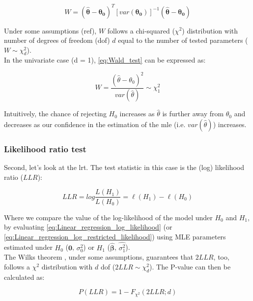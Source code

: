 \begin{equation}\label{eq:Wald_test}
W = (\hat{\boldsymbol{\theta}}-\boldsymbol{\theta_0})^T [var(\boldsymbol{\theta_0})]^{-1}(\hat{\boldsymbol{\theta}}-\boldsymbol{\theta_0}) 
\end{equation}

Under some assumptions (ref), $W$ follows a chi-squared ($\chi^2$) distribution with number of degrees of freedom (dof) $d$ equal to the number of tested parameters ($W \sim \chi^2_d $).\\

In the univariate case (d = 1), \eqref{eq:Wald_test} can be expressed as:

\begin{equation}\label{eq:Wald_test_univariate}
    W = \frac{(\hat{\theta}-\theta_0)^2}{var(\hat{\theta})} \sim \chi^2_1
\end{equation}

Intuitively, the chance of rejecting $H_0$ increases as $\hat{\theta}$ is further away from $\theta_0$
and decreases as our confidence in the estimation of the \gls{mle} (i.e. $var(\hat{\theta})$) increases.


\subsubsection{Likelihood ratio test}

Second, let's look at the \gls{lrt}.
The test statistic in this case is the (log) likelihood ratio ($LLR$):

\begin{equation}\label{eq:log_likelihood_ratio}
LLR = log \frac{L(H_1)}{L(H_0)} = \ell(H_1) - \ell(H_0) 
\end{equation}

Where we compare the value of the log-likelihood of the model under $H_0$ and $H_1$, by evaluating \eqref{eq:Linear_regression_log_likelihood} (or \eqref{eq:Linear_regression_log_restricted_likelihood}) using MLE parameters estimated under $H_0$ ($\mathbf{0}$, $\sigma_0^2$) or $H_1$ ($\hat{\boldsymbol{\beta}}$, $\hat{\sigma_1^2}$).  \\

The Wilks theorem \cite{wilks1938large}, under some assumptions, guarantees that $2LLR$, too, follows a $\chi^2$ distribution with $d$ dof ($2LLR \sim \chi^2_d$).
The P-value can then be calculated as:

\begin{equation}\label{eq:lrt_p_value}
    P(LLR) = 1-F_{\chi^2}(2LLR; d)
\end{equation}

